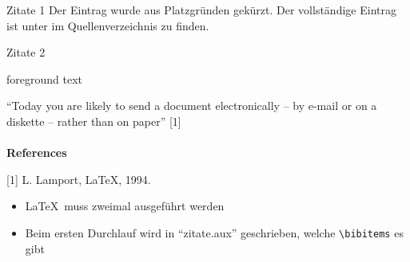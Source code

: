 \documentclass[aspectratio=169]{beamer}
\providecommand{\tightlist}{\setlength{\itemsep}{0pt}\setlength{\parskip}{0pt}}
\newenvironment{Shaded}{\begin{snugshade}}{\end{snugshade}}
\newcommand{\NormalTok}[1]{\textcolor[rgb]{0.19,0.19,0.19}{#1}}
\newenvironment{Shaded}{}{}
\newcommand\citestyle[1]{\textcolor{foreground-secondary}{\textsuperscript{#1}}}
\let\oldcite=\cite
\renewcommand{\cite}[1]{\citestyle{\oldcite{#1}}}
\let\oldautocite\autocite
\renewcommand{\autocite}[1]{\citestyle{\oldautocite{#1}}}
\begin{document}
\begin{frame}[fragile]{Zitate 1}
    \textcolor{foreground-secondary}{\tiny Der Eintrag wurde aus Platzgründen gekürzt. Der vollständige Eintrag ist unter \cite{latex} im Quellenverzeichnis zu finden.}
    \end{frame}

    \begin{frame}[fragile]{Zitate 2}
    \protect\hypertarget{zitate-2}{}
    \begin{minipage}{0.66\textwidth}

\begin{Shaded}
\end{Shaded}

    \end{minipage}\begin{minipage}{0.33\textwidth}

    \bgroup 
        \begin{OutputBox}
        \begin{beamercolorbox}{foreground text}
            \selectfont%

    ``Today you are likely to send a 
    document electronically -- by e-mail 
    or on a diskette -- 
    rather than on paper'' [1]
    \\ \\
    \textbf{\Large References}

    [1] L. Lamport, \LaTeX, 1994.

            \end{beamercolorbox}
        \end{OutputBox}
    \egroup

    \end{minipage}

    \begin{itemize}
    \tightlist
    \item
      \LaTeX~muss zweimal ausgeführt werden \autocite{overleaf-bibtex}
    \item
      Beim ersten Durchlauf wird in \enquote{zitate.aux} geschrieben,
      welche \texttt{\textbackslash{}bibitems} es gibt
      \autocite{overleaf-bibtex}
    \end{itemize}
    \end{frame}
\end{document}
